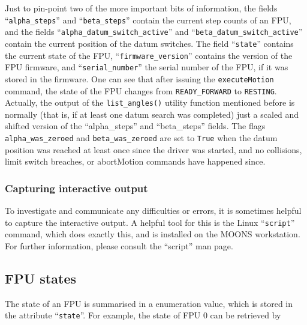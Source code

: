 \documentclass[11pt,a4paper]{scrartcl}
\begin{document}
\begin{sloppypar}
Just to pin-point two of the more important bits of information, the
fields ``\texttt{alpha\_steps}'' and ``\texttt{beta\_steps}'' contain
the current step counts of an FPU, and the fields
``\texttt{alpha\_datum\_switch\_active}'' and
``\texttt{beta\_datum\_switch\_active}'' contain the current position
of the datum switches. The field ``\texttt{state}'' contains the
current state of the FPU, ``\texttt{firmware\_version}'' contains the
version of the FPU firmware, and ``\texttt{serial\_number}'' the
serial number of the FPU, if it was stored in the firmware. One can
see that after issuing the \texttt{executeMotion} command, the state
of the FPU changes from \texttt{READY\_FORWARD} to
\texttt{RESTING}. Actually, the output of the \texttt{list\_angles()}
utility function mentioned before is normally (that is, if at least
one datum search was completed) just a scaled and shifted version of
the ``alpha\_steps'' and ``beta\_steps'' fields. The flags
\texttt{alpha\_was\_zeroed} and \texttt{beta\_was\_zeroed} are set to
\texttt{True} when the datum position was reached at least once since
the driver was started, and no collisions, limit switch breaches, or
abortMotion commands have happened since.
\end{sloppypar}

\subsubsection*{Capturing interactive output}
  To
investigate and communicate any difficulties or errors, it is
sometimes helpful to capture the interactive output. A helpful tool
for this is the Linux ``\texttt{script}'' command, which does exactly
this, and is installed on the MOONS workstation.  For further
information, please consult the ``script'' man page.



\subsection{FPU states}
  
 
 The state of an
FPU is summarised in a enumeration value, which is stored in the
attribute ``\texttt{state}''. For example, the state of FPU 0 can be
retrieved by
\end{document}
